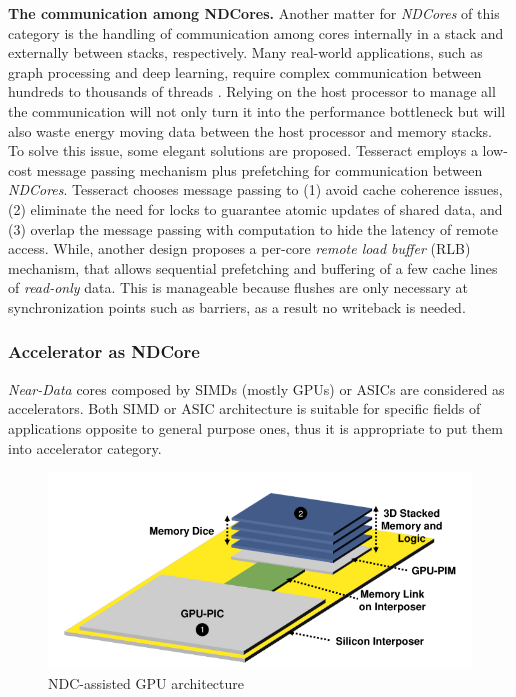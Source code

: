 \documentclass[letterpaper, 11pt, conference, margin=1in]{ieeeconf}   %
\begin{document}
\textbf{The communication among NDCores.} Another matter for \textit{NDCores} of this category is the handling of communication among cores internally in a stack and externally between stacks, respectively. Many real-world applications, such as graph processing and deep learning, require complex communication between hundreds to thousands of threads \cite{Gonzalez:2012:PDG:2387880.2387883, Chilimbi:2014:PAB:2685048.2685094}. Relying on the host processor to manage all the communication will not only turn it into the performance bottleneck but will also waste energy moving data between the host processor and memory stacks.\\
To solve this issue, some elegant solutions are proposed. Tesseract \cite{Ahn:2015:SPA:2749469.2750386} employs a low-cost message passing mechanism plus prefetching for communication between \textit{NDCores}. Tesseract chooses message passing to (1) avoid cache coherence issues, (2) eliminate the need for locks to guarantee atomic updates of shared data, and (3) overlap the message passing with computation to hide the latency of remote access. While, another design \cite{Gao2015} proposes a per-core \textit{remote load buffer} (RLB) mechanism, that allows sequential prefetching and buffering of a few cache lines of \textit{read-only} data. This is manageable because flushes are only necessary at synchronization points such as barriers, as a result no writeback is needed.

\subsubsection{\bf Accelerator as NDCore}
\textit{Near-Data} cores composed by SIMDs (mostly GPUs) or ASICs are considered as accelerators. Both SIMD or ASIC architecture is suitable for specific fields of applications opposite to general purpose ones, thus it is appropriate to put them into accelerator category.

\begin{figure}[h]
  \center
  \includegraphics[scale=0.40]{figures/ndc_gpu.png}
  \caption{NDC-assisted GPU architecture \cite{7756764}}
  \label{fig:NDC-gpu}
\end{figure}
\end{document}
